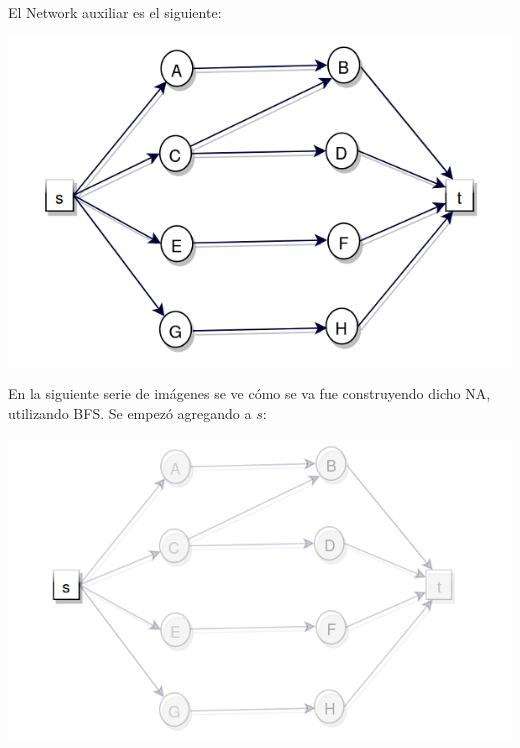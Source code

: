 \documentclass[10pt,a4paper]{article}
\begin{document}
El Network auxiliar es el siguiente:

\begin{center}

    \begin{adjustbox}{max size={\textwidth}{\textheight}}
        \includegraphics{definitions/D0.jpg}
        \end{adjustbox}
    
\end{center}

En la siguiente serie de imágenes se ve cómo se va fue construyendo dicho NA, utilizando BFS. Se empezó agregando a $s$:

\begin{center}


    \begin{adjustbox}{max size={\textwidth}{\textheight}}
        \includegraphics{definitions/D1.jpg}
        \end{adjustbox}
    
\end{center}
\end{document}
